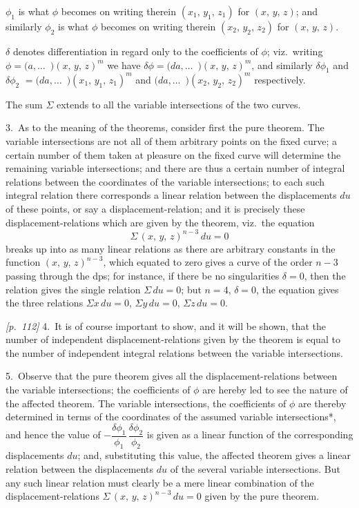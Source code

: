 \documentclass[11pt,a4paper]{article}
\theoremstyle{plain}
\theoremstyle{definition}
\theoremstyle{remark}
\begin{document}
$\phi_1$ is what $\phi$ becomes on writing therein $(x_1,\,y_1,\,z_1)$ for $(x,\,y,\,z)$; and similarly $\phi_2$ is what $\phi$ becomes on writing therein $(x_2,\,y_2,\,z_2)$ for $(x,\,y,\,z)$.

$\delta$ denotes differentiation in regard only to the coefficients of $\phi$; viz.\ writing $\phi = (a,\ldots\!{\,\,\,)}(x,\,y,\,z)^m$ we have $\delta\phi = (da,\ldots\!{\,\,\,)}(x,\,y,\,z)^m$, and similarly $\delta\phi_1$ and $\delta\phi_2$ $= (da,\ldots\!{\,\,\,)}(x_1,\,y_1,\,z_1)^m$ and $(da,\ldots\!{\,\,\,)}(x_2,\,y_2,\,z_2)^m$ respectively.

The sum $\Sigma$ extends to all the variable intersections of the two curves.

3.\ As to the meaning of the theorems, consider first the pure theorem. The variable intersections are not all of them arbitrary points on the fixed curve; a certain number of them taken at pleasure on the fixed curve will determine the remaining variable intersections; and there are thus a certain number of integral relations between the coordinates of the variable intersections; to each such integral relation there corresponds a linear relation between the displacements $du$ of these points, or say a displacement-relation; and it is precisely these displacement-relations which are given by the theorem, viz.\ the equation
\[
\Sigma\,(x,\,y,\,z)^{n-3}\,du = 0
\]
breaks up into as many linear relations as there are arbitrary constants in the function $(x,\,y,\,z)^{n-3}$, which equated to zero gives a curve of the order $n - 3$ passing through the dps; for instance, if there be no singularities $\delta = 0$, then the relation gives the single relation $\Sigma\,du = 0$; but $n = 4$, $\delta = 0$, the equation gives the three relations $\Sigma x\,du = 0$, $\Sigma y\,du = 0$, $\Sigma z\,du = 0$.

\noindent\textit{[p.~112]} 4.\ It is of course important to show, and it will be shown, that the number of independent displacement-relations given by the theorem is equal to the number of independent integral relations between the variable intersections.

5.\ Observe that the pure theorem gives all the displacement-relations between the variable intersections; the coefficients of $\phi$ are hereby led to see the nature of the affected theorem. The variable intersections, the coefficients of $\phi$ are thereby determined in terms of the coordinates of the assumed variable intersections*, and hence the value of $-\dfrac{\delta\phi_1}{\phi_1}\,\dfrac{\delta\phi_2}{\phi_2}$ is given as a linear function of the corresponding displacements $du$; and, substituting this value, the affected theorem gives a linear relation between the displacements $du$ of the several variable intersections. But any such linear relation must clearly be a mere linear combination of the displacement-relations $\Sigma\,(x,\,y,\,z)^{n-3}\,du = 0$ given by the pure theorem.
\end{document}
